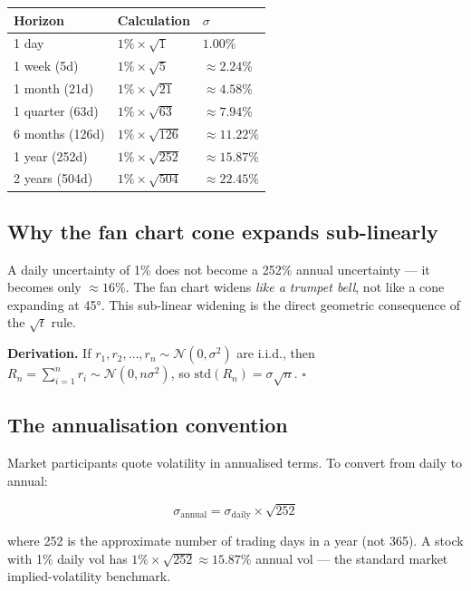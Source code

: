 \documentclass[11pt, a4paper]{article}
\newcommand{\N}{\mathcal{N}}
\begin{document}
\begin{center}
\begin{tabular}{lll}
  \toprule
  Horizon & Calculation & $\sigma$ \\
  \midrule
  1 day     & $1\% \times \sqrt{1}$   & $1.00\%$ \\
  1 week (5d) & $1\% \times \sqrt{5}$  & $\approx 2.24\%$ \\
  1 month (21d) & $1\% \times \sqrt{21}$ & $\approx 4.58\%$ \\
  1 quarter (63d) & $1\% \times \sqrt{63}$ & $\approx 7.94\%$ \\
  6 months (126d) & $1\% \times \sqrt{126}$ & $\approx 11.22\%$ \\
  1 year (252d) & $1\% \times \sqrt{252}$ & $\approx 15.87\%$ \\
  2 years (504d) & $1\% \times \sqrt{504}$ & $\approx 22.45\%$ \\
  \bottomrule
\end{tabular}
\end{center}

\subsection*{Why the fan chart cone expands sub-linearly}

A daily uncertainty of 1\% does not become a 252\% annual uncertainty — it becomes only $\approx 16\%$. The fan chart widens \emph{like a trumpet bell}, not like a cone expanding at 45°. This sub-linear widening is the direct geometric consequence of the $\sqrt{t}$ rule.

\begin{tcolorbox}[infobox]
\textbf{Derivation.}\quad
If $r_1, r_2, \ldots, r_n \sim \N(0, \sigma^2)$ are i.i.d., then $R_n = \sum_{i=1}^n r_i \sim \N(0, n\sigma^2)$, so $\mathrm{std}(R_n) = \sigma\sqrt{n}$. \quad $\square$
\end{tcolorbox}

\subsection*{The annualisation convention}

Market participants quote volatility in annualised terms. To convert from daily to annual:

\[
  \sigma_{\text{annual}} = \sigma_{\text{daily}} \times \sqrt{252}
\]

where 252 is the approximate number of trading days in a year (not 365). A stock with 1\% daily vol has $1\% \times \sqrt{252} \approx 15.87\%$ annual vol — the standard market implied-volatility benchmark.
\end{document}
